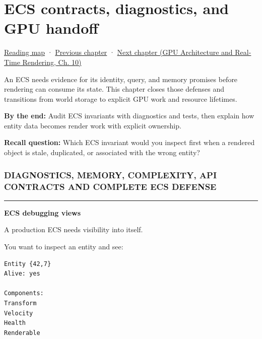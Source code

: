 \chapter{ECS contracts, diagnostics, and GPU handoff}\label{05-engine-i-ch018-ecs-contracts-diagnostics-and-gpu-handoff}\hypertarget{05-engine-i-ch018}{}\label{stagechapter:05-engine-i-ch018}

\hypertarget{05-engine-i-ch018-ecs-contracts-diagnostics-and-gpu-handoff}{}

\hyperref[volume-reading-map]{Reading map} · \hyperref[05-engine-i-ch017-ecs-performance-through-cache-and-scheduling]{Previous chapter} · \href{../06-GPU-Architecture-and-Real-Time-Rendering/main.pdf\#nameddest=05-engine-i-ch019-gpu-work-and-reusable-metal-frames}{Next chapter (GPU Architecture and Real-Time Rendering, Ch. 10)}

An ECS needs evidence for its identity, query, and memory promises before rendering can consume its state. This chapter closes those defenses and transitions from world storage to explicit GPU work and resource lifetimes.

\textbf{By the end:} Audit ECS invariants with diagnostics and tests, then explain how entity data becomes render work with explicit ownership.

\textbf{Recall question:} Which ECS invariant would you inspect first when a rendered object is stale, duplicated, or associated with the wrong entity?

\subsection{DIAGNOSTICS, MEMORY, COMPLEXITY, API CONTRACTS AND COMPLETE ECS DEFENSE}\label{05-engine-i-ch018-diagnostics-memory-complexity-api-contracts-and-complete-ecs-defense}

\hypertarget{05-engine-i-ch018-diagnostics-memory-complexity-api-contracts-and-complete-ecs-defense}{}

\begin{center}\rule{0.5\linewidth}{0.5pt}\end{center}

\textbf{ECS debugging views}

A production ECS needs visibility into itself.

You want to inspect an entity and see:

\begin{verbatim}
Entity {42,7}
Alive: yes

Components:
Transform
Velocity
Health
Renderable
\end{verbatim}

